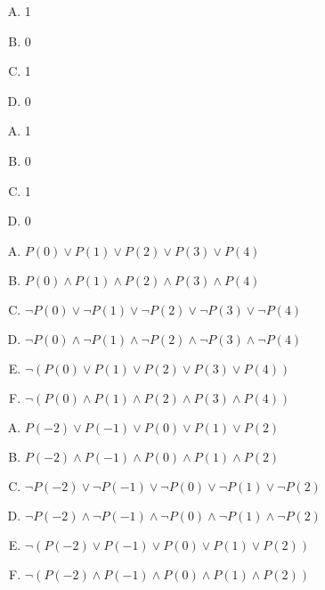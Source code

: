 {{        %
        \begin{practices}
            \begin{enumerate}[A.]
                \item 1
                \item 0
                \item 1
                \item 0
            \end{enumerate}
        \end{practices}

        \begin{practices}
            \begin{enumerate}[A.]
                \item 1
                \item 0
                \item 1
                \item 0
            \end{enumerate}
        \end{practices}

        \begin{practices}
            \begin{enumerate}[A.]
                \item $P(0) \vee P(1) \vee P(2) \vee P(3) \vee P(4)$
                \item $P(0) \wedge P(1) \wedge P(2) \wedge P(3) \wedge P(4)$
                \item $\neg P(0) \vee \neg P(1) \vee \neg P(2) \vee \neg P(3) \vee \neg P(4)$
                \item $\neg P(0) \wedge \neg P(1) \wedge \neg P(2) \wedge \neg P(3) \wedge \neg P(4)$
                \item $\neg (P(0) \vee P(1) \vee P(2) \vee P(3) \vee P(4))$
                \item $\neg (P(0) \wedge P(1) \wedge P(2) \wedge P(3) \wedge P(4))$
            \end{enumerate}
        \end{practices}

        \begin{practices}
            \begin{enumerate}[A.]
                \item $P(-2) \vee P(-1) \vee P(0) \vee P(1) \vee P(2)$
                \item $P(-2) \wedge P(-1) \wedge P(0) \wedge P(1) \wedge P(2)$
                \item $\neg P(-2) \vee \neg P(-1) \vee \neg P(0) \vee \neg P(1) \vee \neg P(2)$
                \item $\neg P(-2) \wedge \neg P(-1) \wedge \neg P(0) \wedge \neg P(1) \wedge \neg P(2)$
                \item $\neg (P(-2) \vee P(-1) \vee P(0) \vee P(1) \vee P(2))$
                \item $\neg (P(-2) \wedge P(-1) \wedge P(0) \wedge P(1) \wedge P(2))$
            \end{enumerate}
        \end{practices}

}}

